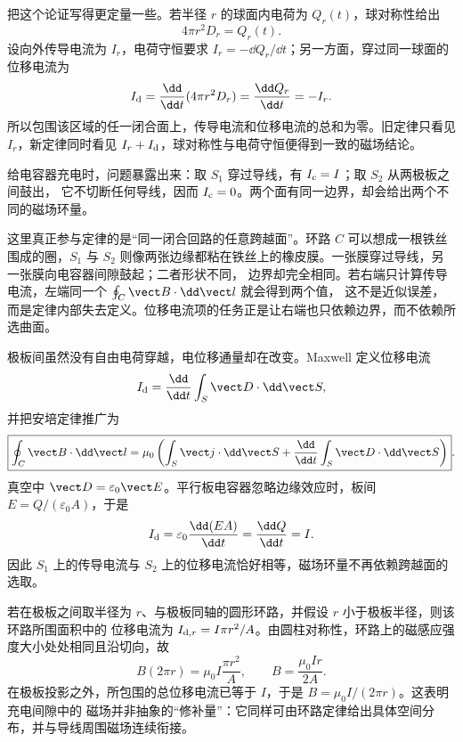 把这个论证写得更定量一些。若半径 $r$ 的球面内电荷为 $Q_r(t)$，球对称性给出
\begin{equation}
  4\pi r^2D_r=Q_r(t).
\end{equation}
设向外传导电流为 $I_r$，电荷守恒要求 $I_r=-\dd Q_r/\dd t$；另一方面，穿过同一球面的位移电流为
\begin{equation}
  I_{\rm d}=\frac{\dd}{\dd t}(4\pi r^2D_r)=\frac{\dd Q_r}{\dd t}=-I_r.
\end{equation}
所以包围该区域的任一闭合面上，传导电流和位移电流的总和为零。旧定律只看见 $I_r$，新定律同时看见
$I_r+I_{\rm d}$，球对称性与电荷守恒便得到一致的磁场结论。

给电容器充电时，问题暴露出来：取 $S_1$ 穿过导线，有 $I_{\rm c}=I$；取 $S_2$ 从两极板之间鼓出，
它不切断任何导线，因而 $I_{\rm c}=0$。两个面有同一边界，却会给出两个不同的磁场环量。

这里真正参与定律的是“同一闭合回路的任意跨越面”。环路 $C$ 可以想成一根铁丝围成的圈，$S_1$ 与
$S_2$ 则像两张边缘都粘在铁丝上的橡皮膜。一张膜穿过导线，另一张膜向电容器间隙鼓起；二者形状不同，
边界却完全相同。若右端只计算传导电流，左端同一个 $\oint_C\vect B\cdot\dd\vect l$ 就会得到两个值，
这不是近似误差，而是定律内部失去定义。位移电流项的任务正是让右端也只依赖边界，而不依赖所选曲面。

\displacementCurrentDiagram

极板间虽然没有自由电荷穿越，电位移通量却在改变。Maxwell 定义位移电流
\begin{equation}
  I_{\rm d}=\frac{\dd}{\dd t}\int_S\vect D\cdot\dd\vect S,
\end{equation}
并把安培定律推广为
\begin{equation}
  \boxed{\oint_C\vect B\cdot\dd\vect l
  =\mu_0\left(\int_S\vect j\cdot\dd\vect S
  +\frac{\dd}{\dd t}\int_S\vect D\cdot\dd\vect S\right)}.
\end{equation}
真空中 $\vect D=\varepsilon_0\vect E$。平行板电容器忽略边缘效应时，板间
$E=Q/(\varepsilon_0 A)$，于是
\begin{equation}
  I_{\rm d}=\varepsilon_0\frac{\dd(EA)}{\dd t}
  =\frac{\dd Q}{\dd t}=I.
\end{equation}
因此 $S_1$ 上的传导电流与 $S_2$ 上的位移电流恰好相等，磁场环量不再依赖跨越面的选取。

若在极板之间取半径为 $r$、与极板同轴的圆形环路，并假设 $r$ 小于极板半径，则该环路所围面积中的
位移电流为 $I_{{\rm d},r}=I\pi r^2/A$。由圆柱对称性，环路上的磁感应强度大小处处相同且沿切向，故
\begin{equation}
  B(2\pi r)=\mu_0I\frac{\pi r^2}{A},
  \qquad B=\frac{\mu_0Ir}{2A}.
\end{equation}
在极板投影之外，所包围的总位移电流已等于 $I$，于是 $B=\mu_0I/(2\pi r)$。这表明充电间隙中的
磁场并非抽象的“修补量”：它同样可由环路定律给出具体空间分布，并与导线周围磁场连续衔接。

